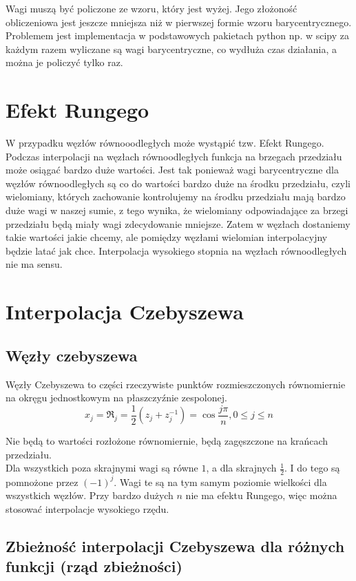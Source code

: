 \documentclass[a4paper]{article}
\begin{document}
Wagi muszą być policzone ze wzoru, który jest wyżej. Jego złożoność obliczeniowa jest jeszcze mniejsza niż w pierwszej formie wzoru barycentrycznego. Problemem jest implementacja w podstawowych pakietach python np. w scipy za każdym razem wyliczane są wagi barycentryczne, co wydłuża czas działania, a można je policzyć tylko raz.

\section{Efekt Rungego}
W przypadku węzłów równooodległych może wystąpić tzw. Efekt Rungego. \\
Podczas interpolacji na węzłach równoodległych funkcja na brzegach przedziału może osiągać bardzo duże wartości. Jest tak ponieważ wagi barycentryczne dla węzłów równoodległych są co do wartości bardzo duże na środku przedziału, czyli wielomiany, których zachowanie kontrolujemy na środku przedziału mają bardzo duże wagi w naszej sumie, z tego wynika, że wielomiany odpowiadające za brzegi przedziału będą miały wagi zdecydowanie mniejsze. Zatem w węzłach dostaniemy takie wartości jakie chcemy, ale pomiędzy węzłami wielomian interpolacyjny będzie latać jak chce. Interpolacja wysokiego stopnia na węzłach równoodległych nie ma sensu.

\section{Interpolacja Czebyszewa}

\subsection{Węzły czebyszewa}
Węzły Czebyszewa to części rzeczywiste punktów rozmieszczonych równomiernie na okręgu jednostkowym na płaszczyźnie zespolonej.
\begin{equation*}
    x_j=\Re_j = \frac{1}{2} (z_j+z_j^{-1})= \cos{\frac{j\pi}{n}},0 \leq j \leq n
\end{equation*}

Nie będą to wartości rozłożone równomiernie, będą zagęszczone na krańcach przedziału. \\
Dla wszystkich poza skrajnymi wagi są równe $1$, a dla skrajnych $\frac{1}{2}$. I do tego są pomnożone przez $(-1)^j$. Wagi te są na tym samym poziomie wielkości dla wszystkich węzłów. Przy bardzo dużych $n$ nie ma efektu Rungego, więc można stosować interpolacje wysokiego rzędu.

\subsection{Zbieżność interpolacji Czebyszewa dla różnych funkcji (rząd zbieżności)}
\end{document}
